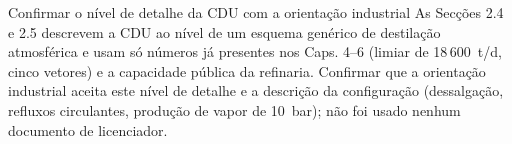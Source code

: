 {Confirmar o nível de detalhe da CDU com a orientação industrial}
{As Secções 2.4 e 2.5 descrevem a CDU ao nível de um esquema genérico de
destilação atmosférica e usam só números já presentes nos Caps. 4--6
(limiar de 18\,600~t/d, cinco vetores) e a capacidade pública da refinaria.
Confirmar que a orientação industrial aceita este nível de detalhe e a
descrição da configuração (dessalgação, refluxos circulantes, produção de
vapor de 10~bar); não foi usado nenhum documento de licenciador.}%

